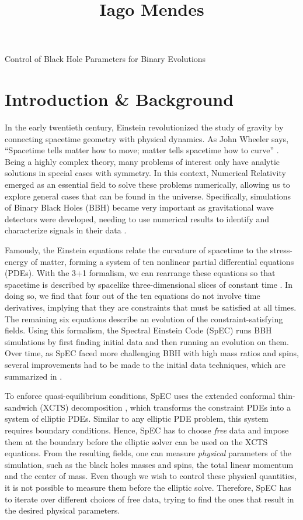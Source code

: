 \documentclass{../letter}
\begin{document}
	\title
		[Caltech SURF Proposal]
		{Iago Mendes}
		{Control of Black Hole Parameters for Binary Evolutions}

	\section{Introduction \& Background}

	In the early twentieth century, Einstein revolutionized the study of gravity by connecting spacetime geometry with physical dynamics. As John Wheeler says, ``Spacetime tells matter how to move; matter tells spacetime how to curve'' \cite{Wheeler}. Being a highly complex theory, many problems of interest only have analytic solutions in special cases with symmetry. In this context, Numerical Relativity emerged as an essential field to solve these problems numerically, allowing us to explore general cases that can be found in the universe. Specifically, simulations of Binary Black Holes (BBH) became very important as gravitational wave detectors were developed, needing to use numerical results to identify and characterize signals in their data \cite{LIGO}.

	Famously, the Einstein equations relate the curvature of spacetime to the stress-energy of matter, forming a system of ten nonlinear partial differential equations (PDEs). With the 3+1 formalism, we can rearrange these equations so that spacetime is described by spacelike three-dimensional slices of constant time \cite{Alcubierre}. In doing so, we find that four out of the ten equations do not involve time derivatives, implying that they are constraints that must be satisfied at all times. The remaining six equations describe an evolution of the constraint-satisfying fields. Using this formalism, the Spectral Einstein Code (SpEC) \cite{SpEC} runs BBH simulations by first finding initial data and then running an evolution on them. Over time, as SpEC faced more challenging BBH with high mass ratios and spins, several improvements had to be made to the initial data techniques, which are summarized in \cite{Serguei}.
	
	To enforce quasi-equilibrium conditions, SpEC uses the extended conformal thin-sandwich (XCTS) decomposition \cite{Serguei}, which transforms the constraint PDEs into a system of elliptic PDEs. Similar to any elliptic PDE problem, this system requires boundary conditions. Hence, SpEC has to choose \textit{free} data and impose them at the boundary before the elliptic solver can be used on the XCTS equations. From the resulting fields, one can measure \textit{physical} parameters of the simulation, such as the black holes masses and spins, the total linear momentum and the center of mass. Even though we wish to control these physical quantities, it is not possible to measure them before the elliptic solve. Therefore, SpEC has to iterate over different choices of free data, trying to find the ones that result in the desired physical parameters.
	
\end{document}
